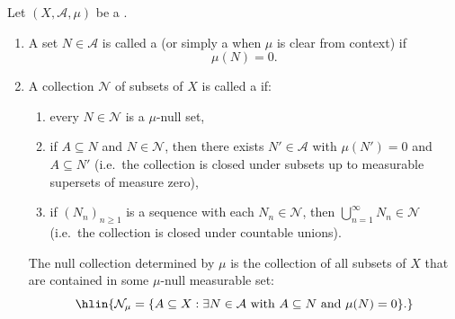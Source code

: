 \begin{definition} \label{definition:null_set_and_null_collection_for_a_measure_on_a_measurable_space}
Let $(X, \mathcal{A}, \mu)$ be a .

\begin{enumerate}
    \item A set $N \in \mathcal{A}$ is called a  (or simply a  when $\mu$ is clear from context) if
    $$\mu(N) = 0.$$

    \item A collection $\mathcal{N}$ of subsets of $X$ is called a  if:
    \begin{enumerate}
        \item every $N \in \mathcal{N}$ is a $\mu$-null set,
        \item if $A \subseteq N$ and $N \in \mathcal{N}$, then there exists $N' \in \mathcal{A}$ with $\mu(N') = 0$ and $A \subseteq N'$ (i.e.\ the collection is closed under subsets up to measurable supersets of measure zero),
        \item if $(N_n)_{n\ge 1}$ is a sequence with each $N_n \in \mathcal{N}$, then $\bigcup_{n=1}^\infty N_n \in \mathcal{N}$ (i.e.\ the collection is closed under countable unions).
    \end{enumerate}

    The null collection determined by $\mu$ is the collection of all subsets of $X$ that are contained in some $\mu$-null measurable set:
    $$\hlin{\mathcal{N}_\mu = \{ A \subseteq X : \exists N \in \mathcal{A} \text{ with } A \subseteq N \text{ and } \mu(N) = 0\}.}$$
\end{enumerate}
\end{definition}
